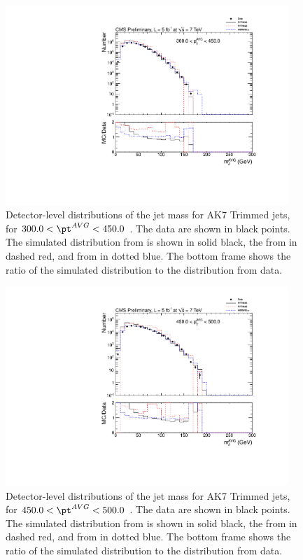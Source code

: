 \begin{figure}[htbp]
\centering
\includegraphics[width=0.95\textwidth]{figs/histAK7MjetVsPtAvg_rawDataMCComparisons_pt_5_Trimmed}
\caption{Detector-level distributions of the jet mass for AK7 Trimmed jets,
for $300.0 < \pt^{AVG} < 450.0$ \GeVc. The data are shown in black points.
The simulated distribution from \PYTHIA is shown in solid black, 
the from \PYTHIAEIGHT in dashed red, and from \HERWIG in dotted blue. 
The bottom frame shows the ratio of the simulated distribution
to the distribution from data. 
\label{figs:histAK7MjetVsPtAvg_rawDataMCComparisons_pt_5_Trimmed}}
\end{figure}

\fi


\ifnpas

\begin{figure}[htbp]
\centering
\includegraphics[width=0.95\textwidth]{figs/histAK7MjetVsPtAvg_rawDataMCComparisons_pt_6_Trimmed}
\caption{Detector-level distributions of the jet mass for AK7 Trimmed jets,
for $450.0 < \pt^{AVG} < 500.0$ \GeVc. The data are shown in black points.
The simulated distribution from \PYTHIA is shown in solid black, 
the from \PYTHIAEIGHT in dashed red, and from \HERWIG in dotted blue. 
The bottom frame shows the ratio of the simulated distribution
to the distribution from data. 
\label{figs:histAK7MjetVsPtAvg_rawDataMCComparisons_pt_6_Trimmed}}
\end{figure}



